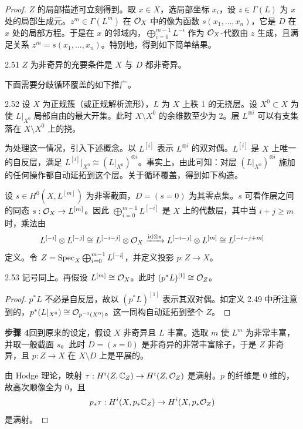 \begin{proof}
$Z$ 的局部描述可立刻得到。取 $x\in X$，选局部坐标 $x_i$，设 $z\in\Gamma(L)$ 为 $x$ 处的局部生成元。$z^m\in\Gamma(L^m)$ 在 $\mathcal{O}_X$ 中的像为函数 $s(x_1,\dots,x_n)$，它是 $D$ 在 $x$ 处的局部方程。于是在 $x$ 的邻域内，$\bigoplus_{i=0}^{m-1}L^{-i}$ 作为 $\mathcal{O}_X$-代数由 $z$ 生成，且满足关系 $z^m=s(x_1,\dots,x_n)$。特别地，得到如下简单结果。

\begin{lemma*}{2.51}
$Z$ 为非奇异的充要条件是 $X$ 与 $D$ 都非奇异。
\end{lemma*}

下面需要分歧循环覆盖的如下推广。

\begin{definition}{2.52}
设 $X$ 为正规簇（或正规解析流形），$L$ 为 $X$ 上秩 1 的无挠层。设 $X^0\subset X$ 为使 $L|_{X^0}$ 局部自由的最大开集。此时 $X\setminus X^0$ 的余维数至少为 2。层 $L^{\otimes i}$ 可以有支集落在 $X\setminus X^0$ 上的挠。

为处理这一情况，引入下述概念。以 $L^{[i]}$ 表示 $L^{\otimes i}$ 的双对偶。$L^{[i]}$ 是 $X$ 上唯一的自反层，满足 $L^{[i]}|_{X^0}\cong(L|_{X^0})^{\otimes i}$。事实上，由此可知：对层 $(L|_{X^0})^{\otimes i}$ 施加的任何操作都自动延拓到这个层。关于循环覆盖，得到如下构造。

设 $s\in H^0(X,L^{[m]})$ 为非零截面，$D=(s=0)$ 为其零点集。$s$ 可看作层之间的同态 $s:\mathcal{O}_X\to L^{[m]}$。因此 $\bigoplus_{i=0}^{m-1}L^{[-i]}$ 是 $X$ 上的代数层，其中当 $i+j\ge m$ 时，乘法由
\[
L^{[-i]}\otimes L^{[-j]}\cong L^{[-i-j]}\otimes\mathcal{O}_X\xrightarrow{\mathrm{id}\otimes s}L^{[-i-j]}\otimes L^{[m]}\cong L^{[-i-j+m]}
\]
定义。令 $Z=\operatorname{Spec}_X\bigoplus_{i=0}^{m-1}L^{[-i]}$，并定义投影 $p:Z\to X$。
\end{definition}

\begin{lemmap}{2.53}
记号同上。再假设 $L^{[m]}\cong\mathcal{O}_X$。此时 $(p^*L)^{[1]}\cong\mathcal{O}_Z$。
\end{lemmap}

\begin{proof}
$p^*L$ 不必是自反层，故以 $(p^*L)^{[1]}$ 表示其双对偶。如定义 2.49 中所注意到的，$p^*(L|_{X^0})\cong\mathcal{O}_{p^{-1}(X^0)}$。这一同构自动延拓到整个 $Z$。
\end{proof}

\textbf{步骤 4}\quad 回到原来的设定，假设 $X$ 非奇异且 $L$ 丰富。选取 $m$ 使 $L^m$ 为非常丰富，并取一般截面 $s$。此时 $D=(s=0)$ 是非奇异的非常丰富除子，于是 $Z$ 非奇异，且 $p:Z\to X$ 在 $X\setminus D$ 上是平展的。

由 Hodge 理论，映射 $\tau:H^i(Z,\mathbb{C}_Z)\to H^i(Z,\mathcal{O}_Z)$ 是满射。$p$ 的纤维是 0 维的，故高次顺像全为 0，且
\[
p_*\tau:H^i(X,p_*\mathbb{C}_Z)\to H^i(X,p_*\mathcal{O}_Z)
\]
是满射。


\end{proof}
